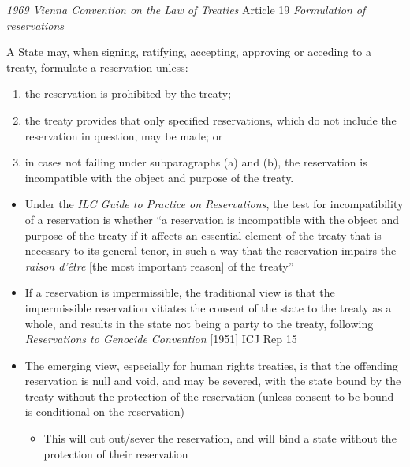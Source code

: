\begin{conventiondetails}{\textit{1969 Vienna Convention on the Law of Treaties} Article 19}\label{VCLT Art 19}
    \flushleft
    \textit{Formulation of reservations}

    \vspace{\baselineskip}

    A State may, when signing, ratifying, accepting, approving or acceding to a treaty, formulate a  reservation unless:
    \begin{enumerate}[label=(\alph*)]
        \item the reservation is prohibited by the treaty; 
        \item the treaty provides that only specified reservations, which do not include the reservation in question, may be made; or 
        \item in cases not failing under subparagraphs (a) and (b), the reservation is incompatible with the object and purpose of the treaty. 
    \end{enumerate}
\end{conventiondetails}

\begin{itemize}
    \item Under the \textit{ILC Guide to Practice on Reservations}, the test for incompatibility of a reservation is whether ``a reservation is incompatible with the object and purpose of the treaty if it affects an essential element of the treaty that is necessary to its general tenor, in such a way that the reservation impairs the \textit{raison d'être} [the most important reason] of the treaty''
    \item If a reservation is impermissible, the traditional view is that the impermissible reservation vitiates the consent of the state to the treaty as a whole, and results in the state not being a party to the treaty, following \textit{Reservations to Genocide Convention} [1951] ICJ Rep 15
    \item The emerging view, especially for human rights treaties, is that the offending reservation is null and void, and may be severed, with the state bound by the treaty without the protection of the reservation (unless consent to be bound is conditional on the reservation)
    \begin{itemize}
        \item This will cut out/sever the reservation, and will bind a state without the protection of their reservation
    \end{itemize}
\end{itemize}

